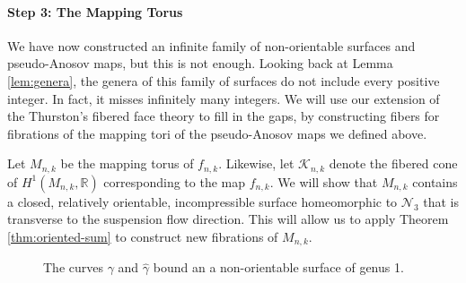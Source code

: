 \paragraph{Step 3: The Mapping Torus}

We have now constructed an infinite family of non-orientable surfaces and pseudo-Anosov maps, but this is not
enough. Looking back at Lemma \ref{lem:genera}, the genera of this family of surfaces do not include every
positive integer. In fact, it misses infinitely many integers. We will use our extension of the Thurston's
fibered face theory to fill in the gaps, by constructing fibers for fibrations of the mapping tori of the
pseudo-Anosov maps we defined above.

Let $M_{n,k}$ be the mapping torus of $f_{n,k}$. Likewise, let $\mathcal{K}_{n,k}$ denote the fibered cone of
$H^1(M_{n,k},\mathbb{R})$ corresponding to the map $f_{n,k}$. We will show that $M_{n,k}$ contains a closed,
relatively orientable, incompressible surface homeomorphic to $\mathcal{N}_3$ that is transverse to the
suspension flow direction. This will allow us to apply Theorem \ref{thm:oriented-sum} to construct
new fibrations of $M_{n,k}$.

\begin{figure}[h]
    \centering
    \caption{The curves $\gamma$ and $\hat{\gamma}$ bound an a non-orientable surface of genus 1.}
    \label{fig:gammacurves}
\end{figure}

